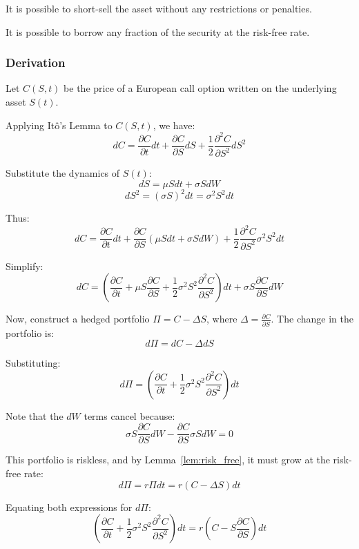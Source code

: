 \begin{assumption}
    It is possible to short-sell the asset without any restrictions or penalties.
\end{assumption}

\begin{assumption}
    It is possible to borrow any fraction of the security at the risk-free rate.
\end{assumption}


\subsubsection{Derivation}
Let \( C(S,t) \) be the price of a European call option written on the underlying asset \( S(t) \).

Applying Itô's Lemma to \( C(S,t) \), we have:
\[
dC = \frac{\partial C}{\partial t} dt + \frac{\partial C}{\partial S} dS + \frac{1}{2} \frac{\partial^2 C}{\partial S^2} dS^2
\]

Substitute the dynamics of \( S(t) \):
\[
dS = \mu S dt + \sigma S dW
\]
\[
dS^2 = (\sigma S)^2 dt = \sigma^2 S^2 dt
\]

Thus:
\[
dC = \frac{\partial C}{\partial t} dt + \frac{\partial C}{\partial S} (\mu S dt + \sigma S dW) + \frac{1}{2} \frac{\partial^2 C}{\partial S^2} \sigma^2 S^2 dt
\]

Simplify:
\[
dC = \left( \frac{\partial C}{\partial t} + \mu S \frac{\partial C}{\partial S} + \frac{1}{2} \sigma^2 S^2 \frac{\partial^2 C}{\partial S^2} \right) dt + \sigma S \frac{\partial C}{\partial S} dW
\]

Now, construct a hedged portfolio \( \Pi = C - \Delta S \), where \( \Delta = \frac{\partial C}{\partial S} \). The change in the portfolio is:
\[
d\Pi = dC - \Delta dS
\]

Substituting:
\[
d\Pi = \left( \frac{\partial C}{\partial t} + \frac{1}{2} \sigma^2 S^2 \frac{\partial^2 C}{\partial S^2} \right) dt
\]

Note that the \( dW \) terms cancel because:
\[
\sigma S \frac{\partial C}{\partial S} dW - \frac{\partial C}{\partial S} \sigma S dW = 0
\]

This portfolio is riskless, and by Lemma~\ref{lem:risk_free}, it must grow at the risk-free rate:
\[
d\Pi = r \Pi dt = r(C - \Delta S) dt
\]

Equating both expressions for \( d\Pi \):
\[
\left( \frac{\partial C}{\partial t} + \frac{1}{2} \sigma^2 S^2 \frac{\partial^2 C}{\partial S^2} \right) dt = r \left( C - S \frac{\partial C}{\partial S} \right) dt
\]

